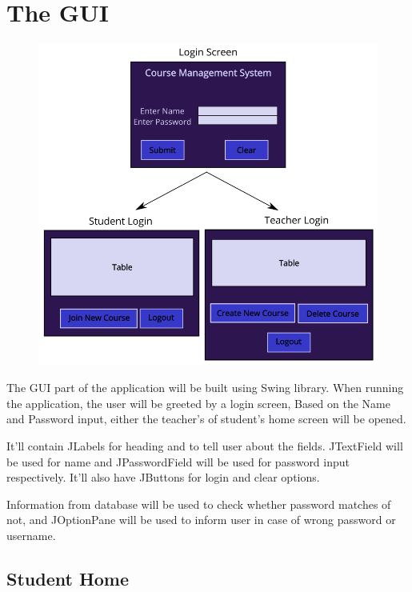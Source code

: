 \documentclass[12pt, a4paper]{article}
\begin{document}
\newpage

\tableofcontents

\newpage

\section{The GUI}

\begin{figure}[h]
	\centering
	\includegraphics[width=15cm]{figures/gui1.png}
\end{figure}

The GUI part of the application will be built using Swing library.
When running the application, the user will be greeted by a login screen, Based on the Name and Password input, either the teacher's of student's home screen will be opened.

It'll contain JLabels for heading and to tell user about the fields. JTextField will be used for name and JPasswordField will be used for password input respectively. It'll also have JButtons for login and clear options.

Information from database will be used to check whether password matches of not, and JOptionPane will be used to inform user in case of wrong password or username.

\subsection{Student Home}
\end{document}
